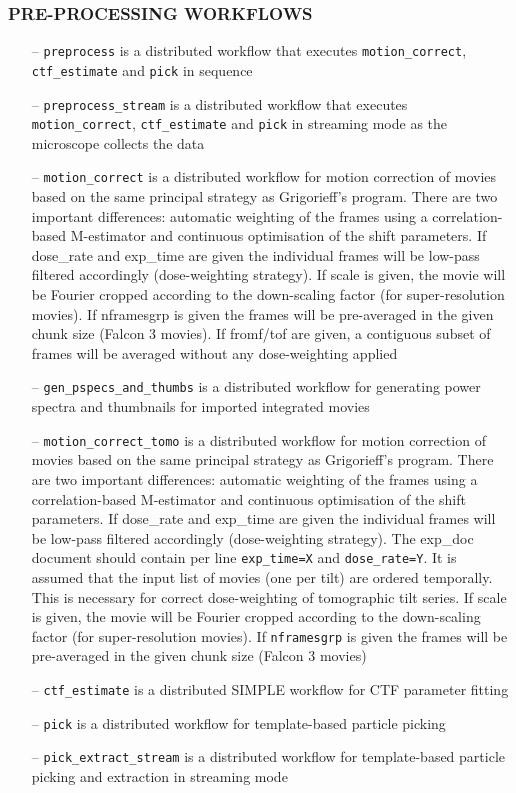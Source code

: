 \documentclass[a4paper,11pt]{article}
\newcommand{\prgname}[1]{\textcolor{NavyBlue}{\texttt{#1}}}
\begin{document}
\subsubsection{PRE-PROCESSING WORKFLOWS}
\begin{itemize}
\item[--] \prgname{preprocess} is a distributed workflow that executes \prgname{motion\_correct}, \prgname{ctf\_estimate} and \prgname{pick} in sequence
\item[--] \prgname{preprocess\_stream} is a distributed workflow that executes \prgname{motion\_correct}, \prgname{ctf\_estimate} and \prgname{pick} in streaming mode as the microscope collects the data
\item[--] \prgname{motion\_correct} is a distributed workflow for motion correction of movies based on the same principal strategy as Grigorieff's program. There are two important differences: automatic weighting of the frames using a correlation-based M-estimator and continuous optimisation of the shift parameters. If dose\_rate and exp\_time are given the individual frames will be low-pass filtered accordingly (dose-weighting strategy). If scale is given, the movie will be Fourier cropped according to the down-scaling factor (for super-resolution movies). If nframesgrp is given the frames will be pre-averaged in the given chunk size (Falcon 3 movies). If fromf/tof are given, a contiguous subset of frames will be averaged without any dose-weighting applied
\item[--] \prgname{gen\_pspecs\_and\_thumbs} is a distributed workflow for generating power spectra and thumbnails for imported integrated movies
\item[--] \prgname{motion\_correct\_tomo} is a distributed workflow for motion correction of movies based on the same principal strategy as Grigorieff's program. There are two important differences: automatic weighting of the frames using a correlation-based M-estimator and continuous optimisation of the shift parameters. If dose\_rate and exp\_time are given the individual frames will be low-pass filtered accordingly (dose-weighting strategy). The exp\_doc document should contain per line \texttt{exp\_time=X} and \texttt{dose\_rate=Y}. It is assumed that the input list of movies (one per tilt) are ordered temporally. This is necessary for correct dose-weighting of tomographic tilt series. If scale is given, the movie will be Fourier cropped according to the down-scaling factor (for super-resolution movies). If \texttt{nframesgrp} is given the frames will be pre-averaged in the given chunk size (Falcon 3 movies)
\item[--] \prgname{ctf\_estimate} is a distributed SIMPLE workflow for CTF parameter fitting
\item[--] \prgname{pick} is a distributed workflow for template-based particle picking
\item[--] \prgname{pick\_extract\_stream} is a distributed workflow for template-based particle picking and extraction in streaming mode
\end{itemize}
\end{document}
